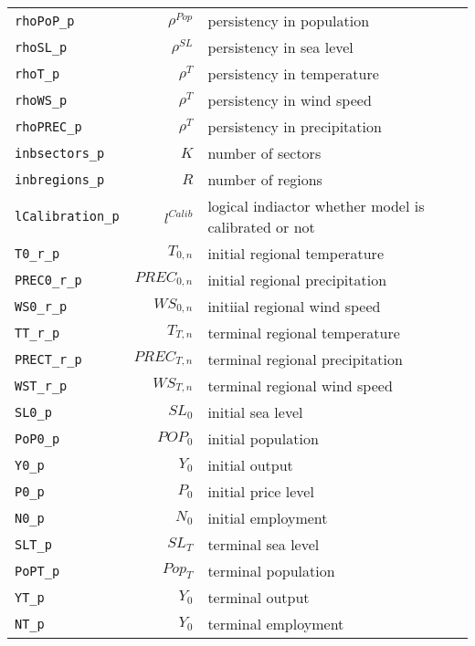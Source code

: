 \begin{center}
\begin{longtable}{lrl}
\texttt{rhoPoP\_p} & ${\rho^{Pop}}$ & persistency in population\\
\texttt{rhoSL\_p} & ${\rho^{SL}}$ & persistency in sea level\\
\texttt{rhoT\_p} & ${\rho^{T}}$ & persistency in temperature\\
\texttt{rhoWS\_p} & ${\rho^{T}}$ & persistency in wind speed\\
\texttt{rhoPREC\_p} & ${\rho^{T}}$ & persistency in precipitation\\
\texttt{inbsectors\_p} & ${K}$ & number of sectors\\
\texttt{inbregions\_p} & ${R}$ & number of regions\\
\texttt{lCalibration\_p} & ${l^{Calib}}$ & logical indiactor whether model is calibrated or not\\
\texttt{T0\_r\_p} & ${T_{0,n}}$ & initial regional temperature\\
\texttt{PREC0\_r\_p} & ${PREC_{0,n}}$ & initial regional precipitation\\
\texttt{WS0\_r\_p} & ${WS_{0,n}}$ & initiial regional wind speed\\
\texttt{TT\_r\_p} & ${T_{T,n}}$ & terminal regional temperature\\
\texttt{PRECT\_r\_p} & ${PREC_{T,n}}$ & terminal regional precipitation\\
\texttt{WST\_r\_p} & ${WS_{T,n}}$ & terminal regional wind speed\\
\texttt{SL0\_p} & ${SL_0}$ & initial sea level\\
\texttt{PoP0\_p} & ${POP_0}$ & initial population\\
\texttt{Y0\_p} & ${Y_0}$ & initial output\\
\texttt{P0\_p} & ${P_0}$ & initial price level\\
\texttt{N0\_p} & ${N_0}$ & initial employment\\
\texttt{SLT\_p} & ${SL_T}$ & terminal sea level\\
\texttt{PoPT\_p} & ${Pop_T}$ & terminal population\\
\texttt{YT\_p} & ${Y_0}$ & terminal output\\
\texttt{NT\_p} & ${Y_0}$ & terminal employment\\
\hline%
\end{longtable}
\end{center}

